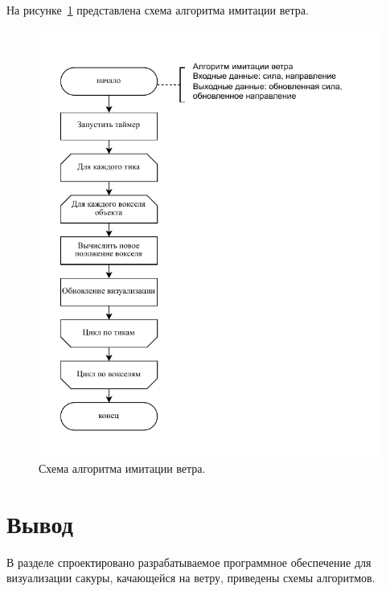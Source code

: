 На рисунке~\ref{fig:cloud_fc2} представлена схема алгоритма имитации ветра.
\begin{figure}[H]
	\centering
	\includegraphics[width=1.0\textwidth, page=1]{assets/img/wind_alg.pdf}   
	\caption{Схема алгоритма имитации ветра.}
	\label{fig:cloud_fc2}
\end{figure}

\section*{Вывод}
В разделе спроектировано разрабатываемое программное обеспечение для визуализации сакуры, качающейся на ветру, приведены схемы алгоритмов.
